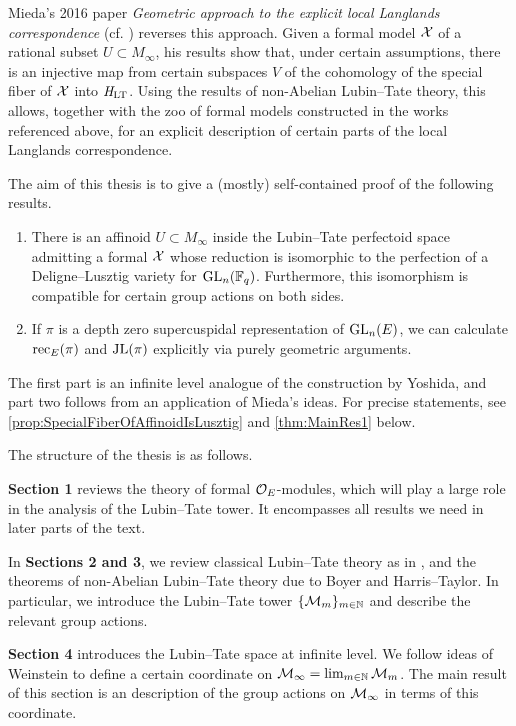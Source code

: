 \documentclass[../main.tex]{subfiles}
\begin{document}
Mieda's 2016 paper \textit{Geometric
  approach to the explicit local Langlands correspondence} (cf.
  \cite{mieda2016geometric}) reverses this approach. Given a formal model $\mathcal{X}$ of a
  rational subset $U \subset M_\infty$, his results show that, under
certain assumptions, there is an injective map
from certain subspaces $V$ of the cohomology of the 
special fiber of $\mathcal{X}$ into $\mathit H_{\mathrm{LT}}$. Using the results of non-Abelian
Lubin--Tate theory, this allows, together with the zoo of formal models
constructed in the works referenced above, for an explicit description of
certain parts of the local Langlands correspondence.

The aim of this thesis is to give a (mostly) self-contained proof of
the following results.
\begin{thm*}
  \leavevmode \begin{enumerate}
    \item There is an affinoid $U \subset M_\infty$ inside the Lubin--Tate perfectoid
      space admitting a formal $\mathcal{X}$ whose reduction is isomorphic to the
      perfection of a Deligne--Lusztig variety for $\operatorname{GL}_n(\mathbb{F}_q)$. Furthermore,
      this isomorphism is compatible for certain group actions on both sides.
    \item If $\pi$ is a depth zero supercuspidal representation of $\operatorname{GL}_n(E)$, 
      we can calculate $\mathrm{rec}_E(\pi)$ and $\mathrm{JL}(\pi)$ explicitly via purely geometric
      arguments.
  \end{enumerate}
\end{thm*}
The first part is an infinite level analogue of the construction by Yoshida,
and part two follows from an application of Mieda's ideas.
For precise statements, see \cref{prop:SpecialFiberOfAffinoidIsLusztig}
and \cref{thm:MainRes1} below. 

The structure of the thesis is as follows.

\textbf{Section 1} reviews the theory of formal $\mathcal{O}_E$-modules, which
will play a large role in the analysis of the Lubin--Tate tower. It encompasses
all results we need in later parts of the text.

In \textbf{Sections 2 and 3}, we review classical Lubin--Tate theory as in
\cite{LubinTateFormalMult}, and the theorems of non-Abelian Lubin--Tate theory
due to Boyer and Harris--Taylor. In particular,
we introduce the Lubin--Tate tower $\{\mathcal{M}_m\}_{m \in \mathbb{N}}$ and describe the
relevant group actions.

\textbf{Section 4} introduces the Lubin--Tate space at infinite level. 
We follow ideas of Weinstein to define a certain coordinate on $\mathcal{M}_\infty = 
\lim_{m \in \mathbb{N}} \mathcal{M}_m$. The main result of this section is an description of
the group actions on $\mathcal{M}_\infty$ in terms of this coordinate. 
\end{document}
